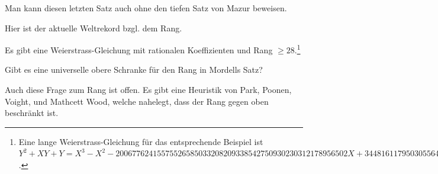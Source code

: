 Man kann diesen letzten Satz auch ohne den tiefen Satz von Mazur beweisen.

Hier ist der aktuelle Weltrekord bzgl. dem Rang.

\begin{satz}[Elkies (2006)]
  Es gibt eine Weierstrass-Gleichung mit rationalen Koeffizienten und
  Rang $\ge 28$.\footnote{
Eine lange Weierstrass-Gleichung für das entsprechende Beispiel ist
$Y^2 + XY + Y = X^3 - X^2 -
20067762415575526585033208209338542750930230312178956502X +
34481611795030556467032985690390720374855944359319180361266008296291939448732243429$. }
\end{satz}

\begin{frage}
  Gibt es eine universelle obere Schranke für den Rang in Mordells Satz?
\end{frage}

Auch diese Frage zum Rang ist offen. Es gibt eine Heuristik von Park,
Poonen, Voight, und Mathcett Wood, welche nahelegt, dass der Rang
gegen oben beschränkt ist.




